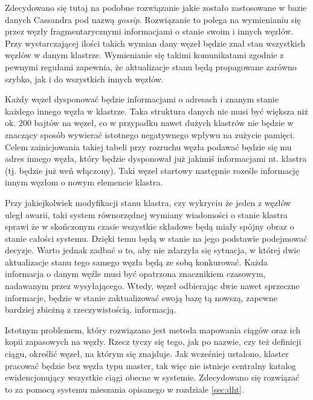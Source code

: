\documentclass[a4paper,polish,12pt,twoside]{article}
\newcommand{\WorkLineSpread}{1.5}
\begin{document}
Zdecydowano się tutaj na podobne rozwiązanie jakie zostało zastosowane w bazie danych Cassandra \cite{Lakshman:2010:CDS:1773912.1773922} pod nazwą \textit{gossip}. Rozwiązanie to polega na wymienianiu się przez węzły fragmentarycznymi informacjami o stanie swoim i innych węzłów. Przy wystarczającej ilości takich wymian dany węzeł będzie znał stan wszystkich węzłów w danym klastrze. Wymienianie się takimi komunikatami zgodnie z pewnymi regułami zapewnia, że aktualizacje stanu będą propagowane zarówno szybko, jak i do wszystkich innych węzłów.

Każdy węzeł dysponować będzie informacjami o adresach i znanym stanie każdego innego węzła w klastrze. Taka struktura danych nie musi być większa niż ok. 200 bajtów na węzeł, co w przypadku nawet dużych klastrów nie będzie w znaczący sposób wywierać istotnego negatywnego wpływu na zużycie pamięci. Celem zainicjowania takiej tabeli przy rozruchu węzła podawać będzie się mu adres innego węzła, który będzie dysponował już jakimiś informacjami nt. klastra (tj. będzie już weń włączony). Taki węzeł startowy następnie roześle informację innym węzłom o nowym elemencie klastra.

Przy jakiejkolwiek modyfikacji stanu klastra, czy wykryciu że jeden z węzłów uległ awarii, taki system równorzędnej wymiany wiadomości o stanie klastra sprawi że w skończonym czasie wszystkie składowe będą miały spójny obraz o stanie całości systemu. Dzięki temu będą w stanie na jego podstawie podejmować decyzje. Warto jednak zadbać o to, aby nie zdarzyła się sytuacja, w której dwie aktualizacje stanu tego samego węzła będą ze sobą konkurować. Każda informacja o danym węźle musi być opatrzona znacznikiem czasowym, nadawanym przez wysyłającego. Wtedy, węzeł odbierając dwie nawet sprzeczne informacje, będzie w stanie zaktualizować swoją bazę tą nowszą, zapewne bardziej zbieżną z rzeczywistością, informacją.

Istotnym problemem, który rozwiązano jest metoda mapowania ciągów oraz ich kopii zapasowych na węzły. Rzecz tyczy się tego, jak po nazwie, czy też definicji ciągu, określić węzeł, na którym się znajduje. Jak wcześniej ustalono, klaster pracować będzie bez węzła typu master, tak więc nie istnieje centralny katalog ewidencjonujący wszystkie ciągi obecne w systemie. Zdecydowano się rozwiązać to za pomocą systemu mieszania opisanego w rozdziale \ref{sec:dht}.

\begin{listing}
\linespread{1} \small  \linespread{\WorkLineSpread} \normalsize
\end{listing}
\end{document}

